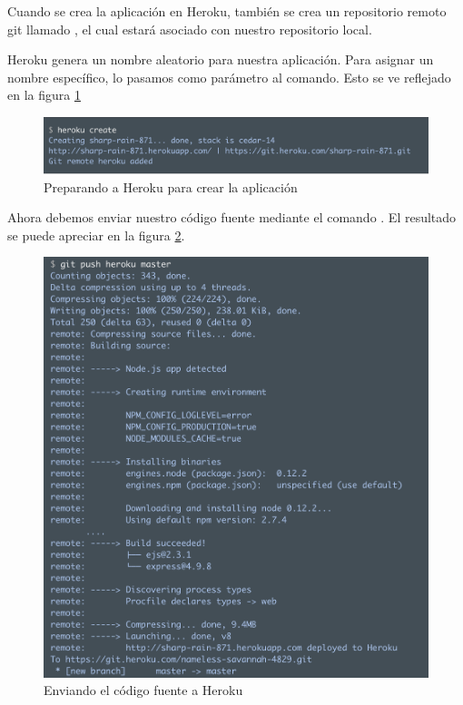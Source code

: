 Cuando se crea la aplicación en Heroku, también se crea un repositorio remoto git llamado , el cual estará asociado con nuestro repositorio local.

Heroku genera un nombre aleatorio para nuestra aplicación. Para asignar un nombre específico, lo pasamos como parámetro al comando. Esto se ve reflejado en la figura \ref{fig:deploy}

 \begin{figure}[H] \centering
    \includegraphics[width=15cm]{graphs/herokuDeploy.png} \caption{Preparando a Heroku para crear la aplicación \cite{heroku}}\label{fig:deploy}
\end{figure}

Ahora debemos enviar nuestro código fuente mediante el comando . El resultado se puede apreciar en la figura \ref{fig:push}.

 \begin{figure}[!htbp] \centering
    \includegraphics[width=15cm]{graphs/herokuPush.png} \caption{Enviando el código fuente a Heroku \cite{heroku}}\label{fig:push}
\end{figure}

